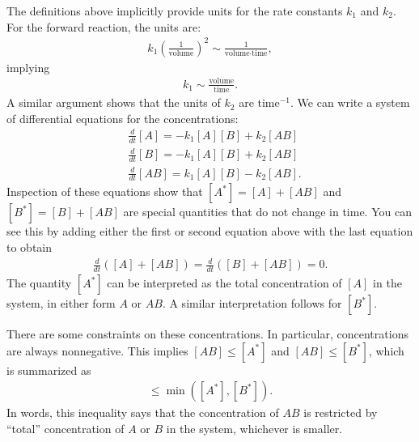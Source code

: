 \documentclass[10pt]{article}
\begin{document}
The definitions above implicitly provide units for the rate constants $k_1$ and $k_2$.  For the forward reaction, the units are:
\begin{align*}
k_1 \left(\frac{1}{\text{volume}} \right)^2 \sim \frac{1}{\text{volume} \cdot \text{time}},
\end{align*}
implying
\begin{align*}
k_1 \sim \frac{\text{volume}}{\text{time}}.
\end{align*}
A similar argument shows that the units of $k_2$ are $\text{time}^{-1}$.  We can write a system of differential equations for the concentrations:
\begin{align*}
&\frac{d}{dt}[A] = -k_1 [A][B] + k_2 [AB] \\
&\frac{d}{dt}[B] = -k_1 [A][B] + k_2 [AB] \\
&\frac{d}{dt}[AB] = k_1 [A][B] - k_2 [AB]. 
\end{align*}
Inspection of these equations show that $[A^*] = [A] + [AB]$ and $[B^*] = [B] + [AB]$ are special quantities that do not change in time.  You can see this by adding either the first or second equation above with the last equation to obtain
\begin{align*}
\frac{d}{dt}\left( [A] + [AB] \right) = \frac{d}{dt}\left( [B] + [AB] \right) = 0. 
\end{align*}
The quantity $[A^*]$ can be interpreted as the total concentration of $[A]$ in the system, in either form $A$ or $AB$.  A similar interpretation follows for $[B^*]$.

There are some constraints on these concentrations.  In particular, concentrations are always nonnegative.  This implies $[AB] \leq [A^*]$ and $[AB] \leq [B^*]$, which is summarized as 
\begin{align*}
[AB] \leq \min([A^*],[B^*]).
\end{align*}
In words, this inequality says that the concentration of $AB$ is restricted by ``total'' concentration of $A$ or $B$ in the system, whichever is smaller. 
\end{document}

